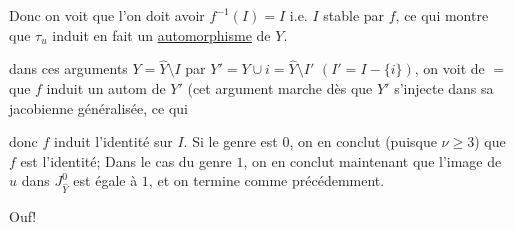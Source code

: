 

 Donc on voit que l'on doit avoir $f^{-1}(I)=I$ i.e. $I$ stable par $f$, ce qui montre que $\tau_u$ induit en fait un \uline{automorphisme} de $Y$.


dans ces arguments $Y=\widehat Y\setminus I$ par $Y'=Y\cup i=\widehat Y\setminus I'$ $(I'=I-\{i\})$, on voit de $=$ que $f$ induit un autom de $Y'$ (cet argument marche dès que $Y'$ s'injecte dans sa jacobienne généralisée, ce qui  

 donc $f$ induit l'identité sur $I$. Si le genre est $0$, on en conclut (puisque $\nu\geq3$) que $f$ est l'identité;  Dans le cas du genre $1$, on en conclut maintenant que l'image de $u$ dans $J_{\widehat Y}^0$ est égale à $1$, et on termine comme précédemment.

Ouf!
